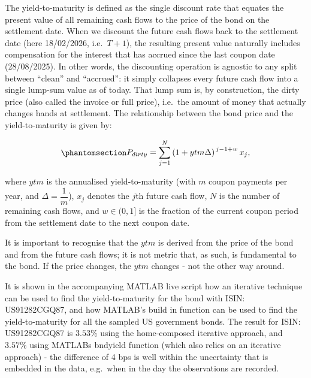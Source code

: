 \documentclass[
  letterpaper,
  DIV=11,
  numbers=noendperiod]{scrreprt}
\begin{document}
The yield-to-maturity is defined as the single discount rate that
equates the present value of all remaining cash flows to the price of
the bond on the settlement date. When we discount the future cash flows
back to the settlement date (here 18/02/2026, i.e.~\(T+1\)), the
resulting present value naturally includes compensation for the interest
that has accrued since the last coupon date (28/08/2025). In other
words, the discounting operation is agnostic to any split between
``clean'' and ``accrued'': it simply collapses every future cash flow
into a single lump-sum value as of today. That lump sum is, by
construction, the dirty price (also called the invoice or full price),
i.e.~the amount of money that actually changes hands at settlement. The
relationship between the bond price and the yield-to-maturity is given
by:

\begin{tcolorbox}[enhanced jigsaw, arc=.35mm, bottomrule=.15mm, bottomtitle=1mm, breakable, colback=white, colbacktitle=quarto-callout-note-color!10!white, colframe=quarto-callout-note-color-frame, coltitle=black, left=2mm, leftrule=.75mm, opacityback=0, opacitybacktitle=0.6, rightrule=.15mm, title=\textcolor{quarto-callout-note-color}{\faInfo}\hspace{0.5em}{Note}, titlerule=0mm, toprule=.15mm, toptitle=1mm]

\protect{}\label{eqn:ytm}{}
\begin{equation}\protect\phantomsection\label{eq-ytm}{  
\begin{align}
        P_{dirty} = \sum_{j=1}^{N} \left(1 + ytm\Delta \right)^{\,j-1+w} x_j,
\end{align}
}\end{equation}

where \(ytm\) is the annualised yield-to-maturity (with \(m\) coupon
payments per year, and \(\Delta =\dfrac{1}{m}\)), \(x_j\) denotes the
\(j\)th future cash flow, \(N\) is the number of remaining cash flows,
and \(w \in (0,1]\) is the fraction of the current coupon period from
the settlement date to the next coupon date.

\end{tcolorbox}

It is important to recognise that the \(ytm\) is derived from the price
of the bond and from the future cash flows; it is not metric that, as
such, is fundamental to the bond. If the price changes, the \(ytm\)
changes - not the other way around.

It is shown in the accompanying MATLAB live script how an iterative
technique can be used to find the yield-to-maturity for the bond with
ISIN: US91282CGQ87, and how MATLAB's build in function can be used to
find the yield-to-maturity for all the sampled US government bonds. The
result for ISIN: US91282CGQ87 is \(3.53\%\) using the home-composed
iterative approach, and \(3.57\%\) using MATLABs bndyield function
(which also relies on an iterative approach) - the difference of 4 bps
is well within the uncertainty that is embedded in the data, e.g.~when
in the day the observations are recorded.
\end{document}
